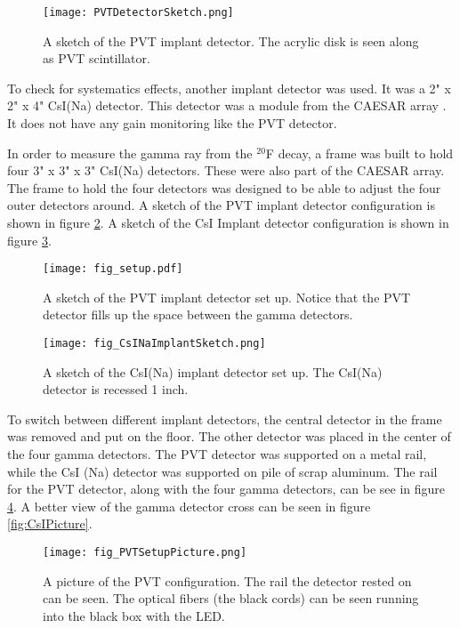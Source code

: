 \documentclass[../MaxHughesThesis.tex]{subfiles}
\begin{document}
\begin{figure}
	\centerline{\texttt{[image: PVTDetectorSketch.png]}}
	\caption{A sketch of the PVT implant detector.
		    The acrylic disk is seen along as PVT scintillator. 
		   }
	\label{fig:PVTDetSketch}
\end{figure}
To check for systematics effects, another implant detector was used.
It was a 2" x 2" x 4"  CsI(Na) detector. 
This detector was a module from the CAESAR array \cite{Wei10}.
It does not have any gain monitoring like the PVT detector.

In order to measure the gamma ray from the $^{20}$F decay, a frame was built to hold four 3" x 3" x 3" CsI(Na) detectors.  
These were also part of the CAESAR array.
The frame to hold the four detectors was designed to be able to adjust the four outer detectors around.
A sketch of the PVT implant detector configuration is shown in figure \ref{fig:detsketch}.
A sketch of the CsI Implant detector configuration is shown in figure \ref{fig:csiimdetsketch}.

\begin{figure}
	\centerline{\texttt{[image: fig\_setup.pdf]}}
	\caption{A sketch of the PVT implant detector set up. 
		 Notice that the PVT detector fills up the space between the gamma detectors.
		 }
	\label{fig:detsketch}
\end{figure}

\begin{figure}
	\centerline{\texttt{[image: fig\_CsINaImplantSketch.png]}}
	\caption{A sketch of the CsI(Na) implant detector set up. 
		    The CsI(Na) detector is recessed 1 inch. 
			}
	\label{fig:csiimdetsketch}
\end{figure}
To switch between different implant detectors, the central detector in the frame was removed and put on the floor.
The other detector was placed in the center of the four gamma detectors.
The PVT detector was supported on a metal rail, while the CsI (Na) detector was supported on pile of scrap aluminum.
The rail for the PVT detector, along with the four gamma detectors,  can be see in figure \ref{fig:PVTPicture}.
A better view of the gamma detector cross can be seen in figure \ref{fig:CsIPicture}.

\begin{figure}
	\centerline{\texttt{[image: fig\_PVTSetupPicture.png]}}
	\caption{A picture of the PVT configuration. 
		 The rail the detector rested on can be seen.
		 The optical fibers (the black cords) can be seen running into the black box with the LED.
		 }
	\label{fig:PVTPicture}
\end{figure}
\end{document}
